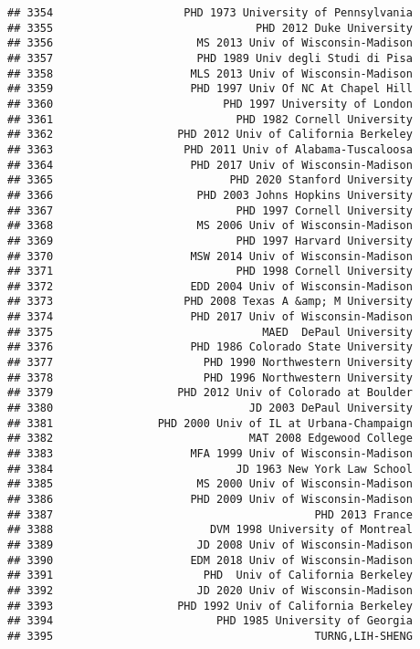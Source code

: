 \documentclass[
]{article}
\begin{document}
\begin{verbatim}
## 3354                    PHD 1973 University of Pennsylvania
## 3355                               PHD 2012 Duke University
## 3356                      MS 2013 Univ of Wisconsin-Madison
## 3357                      PHD 1989 Univ degli Studi di Pisa
## 3358                     MLS 2013 Univ of Wisconsin-Madison
## 3359                     PHD 1997 Univ Of NC At Chapel Hill
## 3360                          PHD 1997 University of London
## 3361                            PHD 1982 Cornell University
## 3362                   PHD 2012 Univ of California Berkeley
## 3363                    PHD 2011 Univ of Alabama-Tuscaloosa
## 3364                     PHD 2017 Univ of Wisconsin-Madison
## 3365                           PHD 2020 Stanford University
## 3366                      PHD 2003 Johns Hopkins University
## 3367                            PHD 1997 Cornell University
## 3368                      MS 2006 Univ of Wisconsin-Madison
## 3369                            PHD 1997 Harvard University
## 3370                     MSW 2014 Univ of Wisconsin-Madison
## 3371                            PHD 1998 Cornell University
## 3372                     EDD 2004 Univ of Wisconsin-Madison
## 3373                    PHD 2008 Texas A &amp; M University
## 3374                     PHD 2017 Univ of Wisconsin-Madison
## 3375                                MAED  DePaul University
## 3376                     PHD 1986 Colorado State University
## 3377                       PHD 1990 Northwestern University
## 3378                       PHD 1996 Northwestern University
## 3379                   PHD 2012 Univ of Colorado at Boulder
## 3380                              JD 2003 DePaul University
## 3381                PHD 2000 Univ of IL at Urbana-Champaign
## 3382                              MAT 2008 Edgewood College
## 3383                     MFA 1999 Univ of Wisconsin-Madison
## 3384                            JD 1963 New York Law School
## 3385                      MS 2000 Univ of Wisconsin-Madison
## 3386                     PHD 2009 Univ of Wisconsin-Madison
## 3387                                        PHD 2013 France
## 3388                        DVM 1998 University of Montreal
## 3389                      JD 2008 Univ of Wisconsin-Madison
## 3390                     EDM 2018 Univ of Wisconsin-Madison
## 3391                       PHD  Univ of California Berkeley
## 3392                      JD 2020 Univ of Wisconsin-Madison
## 3393                   PHD 1992 Univ of California Berkeley
## 3394                         PHD 1985 University of Georgia
## 3395                                        TURNG,LIH-SHENG

\end{verbatim}
\end{document}
